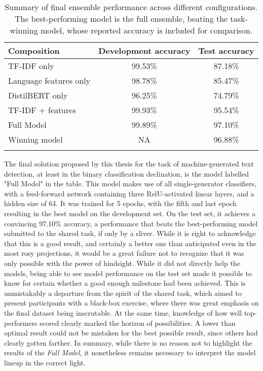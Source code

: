 \begin{table}[ht]
    \vspace{0.1cm}
    \centering
    \begin{tabular}{lcc}
        \toprule
        Composition            & Development accuracy & Test accuracy \\

        \midrule
        TF-IDF only            & 99.53\%              & 87.18\%       \\
        Language features only & 98.78\%              & 85.47\%       \\
        DistilBERT only        & 96.25\%              & 74.79\%       \\
        TF-IDF + features      & 99.93\%              & 95.54\%       \\
        \midrule
        Full Model             & 99.89\%              & 97.10\%       \\
        Winning model          & NA                   & 96.88\%       \\
        \bottomrule
        \vspace{0.1cm}
    \end{tabular}
    \caption{
        Summary of final ensemble performance across different configurations.
        The best-performing model is the full ensemble, beating the task-winning model, whose reported accuracy is included for comparison.
    }
    \label{tab:ensemble-final}
\end{table}

The final solution proposed by this thesis for the task of machine-generated text detection, at least in the binary classification declination, is the model labelled "Full Model" in the table.
This model makes use of all single-generator classifiers, with a feed-forward network containing three RelU-activated linear layers, and a hidden size of 64.
It was trained for 5 epochs, with the fifth and last epoch resulting in the best model on the development set.
On the test set, it achieves a convincing 97.10\% accuracy, a performance that beats the best-performing model submitted to the shared task, if only by a sliver.
While it is right to acknowledge that this is a good result, and certainly a better one than anticipated even in the most rosy projections, it would be a great failure not to recognize that it was only possible with the power of hindsight.
While it did not directly help the models, being able to see model performance on the test set made it possible to know for certain whether a good enough milestone had been achieved.
This is unmistakably a departure from the spirit of the shared task, which aimed to present participants with a black-box exercise, where there was great emphasis on the final dataset being inscrutable.
At the same time, knowledge of how well top-performers scored clearly marked the horizon of possibilities.
A lower than optimal result could not be mistaken for the best possible result, since others had clearly gotten farther.
In summary, while there is no reason not to highlight the results of the \emph{Full Model}, it nonetheless remains necessary to interpret the model lineup in the correct light.

